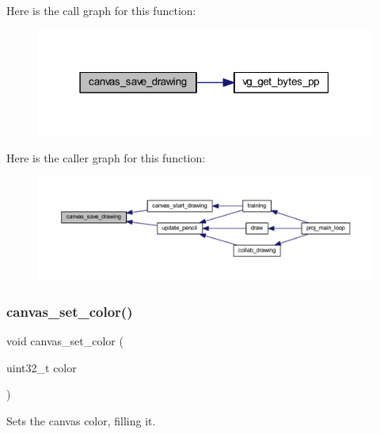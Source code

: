 Here is the call graph for this function\+:\nopagebreak
\begin{figure}[H]
\begin{center}
\leavevmode
\includegraphics[width=315pt]{group__canvas_ga3c9ed75a75ae36bc6fc7591952fccf17_cgraph}
\end{center}
\end{figure}
Here is the caller graph for this function\+:\nopagebreak
\begin{figure}[H]
\begin{center}
\leavevmode
\includegraphics[width=350pt]{group__canvas_ga3c9ed75a75ae36bc6fc7591952fccf17_icgraph}
\end{center}
\end{figure}
\mbox{\label{group__canvas_ga82c276340112469fe11a819ade81ead2}} 
\subsubsection{\texorpdfstring{canvas\+\_\+set\+\_\+color()}{canvas\_set\_color()}}
{\footnotesize\ttfamily void canvas\+\_\+set\+\_\+color (\begin{DoxyParamCaption}\item[{uint32\+\_\+t}]{color }\end{DoxyParamCaption})}



Sets the canvas color, filling it. 


